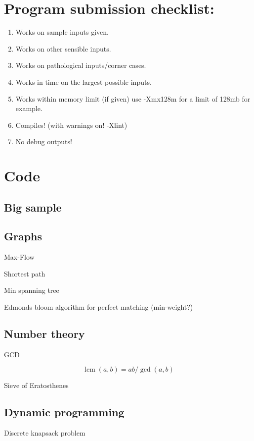 \documentclass[10pt,a4paper]{article}
\newcommand{\codelisting}[1]{
  }
\DeclareMathOperator{\lcm}{lcm}
\begin{document}
\maketitle
\thispagestyle{myheadings}
\section*{Program submission checklist:}
\begin{enumerate}
\item Works on sample inputs given.
\item Works on other sensible inputs.
\item Works on pathological inputs/corner cases.
\item Works in time on the largest possible inputs.
\item Works within memory limit (if given) use -Xmx128m for a limit of 128mb for example.
\item Compiles! (with warnings on! -Xlint)
\item No debug outputs!
\end{enumerate}
\section*{Code}
\subsection*{Big sample}


\subsection*{Graphs}
Max-Flow
\codelisting{fordfulkerson.java}

Shortest path
\codelisting{dijkstra.java}

Min spanning tree
\codelisting{kruskal.java}

Edmonds bloom algorithm for perfect matching (min-weight?)
\codelisting{blossom.java}

\subsection*{Number theory}
GCD
\codelisting{gcd.java}
\[\lcm(a,b) = ab/\gcd(a,b)\]

Sieve of Eratosthenes
\codelisting{seive.java}

\subsection*{Dynamic programming}
Discrete knapsack problem
\codelisting{knapsack.java}
\end{document}
